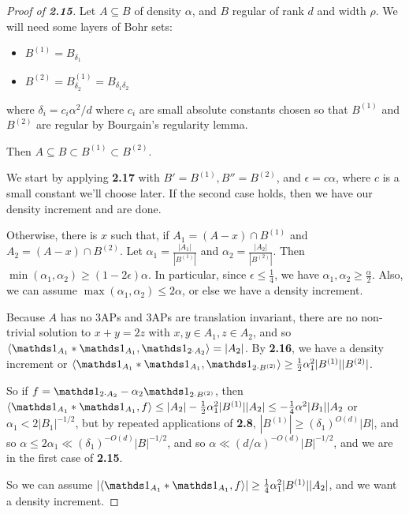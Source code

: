 \documentclass[10pt,a4paper]{article}
\begin{document}
\begin{proof}[Proof of \textbf{2.15}]
  Let $A \subseteq B$ of density $\alpha$, and $B$ regular of rank $d$ and width $\rho$. We will need some layers of Bohr sets:
  \begin{itemize}
    \item $B^{(1)} = B_{\delta_1}$
    \item $B^{(2)} = B^{(1)}_{\delta_2} = B_{\delta_1 \delta_2}$
  \end{itemize}
  where $\delta_i = c_i \alpha^2/d$ where $c_i$ are small absolute constants chosen so that $B^{(1)}$ and $B^{(2)}$ are regular by Bourgain's regularity lemma.

  Then $A \subseteq B \subset B^{(1)} \subset B^{(2)}$.

  We start by applying \textbf{2.17} with $B' = B^{(1)}, B''=B^{(2)}$, and $\epsilon = c\alpha$, where $c$ is a small constant we'll choose later. If the second case holds, then we have our density increment and are done.

  Otherwise, there is $x$ such that, if $A_1 = (A-x) \cap B^{(1)}$ and $A_2 = (A-x)\cap B^{(2)}$. Let $\alpha_1 = \frac{|A_1|}{|B^{(1)}|}$ and $\alpha_2 = \frac{|A_2|}{|B^{(2)}|}$. Then $\min(\alpha_1, \alpha_2) \geq (1-2\epsilon)\alpha$. In particular, since $\epsilon \leq \frac14$, we have $\alpha_1, \alpha_2 \geq \frac{\alpha}{2}$. Also, we can assume $\max(\alpha_1, \alpha_2) \leq 2\alpha$, or else we have a density increment.

  Because $A$ has no 3APs and 3APs are translation invariant, there are no non-trivial solution to $x+y=2z$ with $x,y \in A_1, z \in A_2$, and so $\angle{\one_{A_1} \ast \one_{A_1}, \one_{2\cdot A_2}} = |A_2|$. By \textbf{2.16}, we have a density increment or $\angle{\one_{A_1}\ast \one_{A_1}, \one_{2\cdot B^{(2)}}} \geq \frac{1}{2}\alpha_1^2|B^{(1)}||B^{(2)}|$.

  So if $f = \one_{2\cdot A_2} - \alpha_2 \one_{2\cdot B^{(2)}}$, then $\angle{\one_{A_1}\ast \one_{A_1}, f} \leq |A_2| - \frac12 \alpha_1^2 |B^{(1)}||A_2| \leq -\frac14 \alpha^2 |B_1||A_2$ or $\alpha_1 < 2|B_1|^{-1/2}$, but by repeated applications of \textbf{2.8}, $|B^{(1)}| \geq (\delta_1)^{O(d)}|B|$, and so $\alpha \leq 2\alpha_1 \ll (\delta_1)^{-O(d)}|B|^{-1/2}$, and so $\alpha \ll (d/\alpha)^{-O(d)}|B|^{-1/2}$, and we are in the first case of \textbf{2.15}.

  So we can assume $|\angle{\one_{A_1}\ast \one_{A_1}, f}|\geq \frac14 \alpha_1^2 |B^{(1)}||A_2|$, and we want a density increment.


\end{proof}
\end{document}
